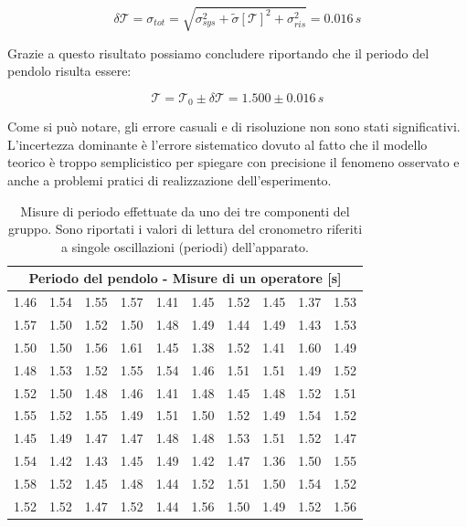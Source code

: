 \begin{equation*}
	\delta\mathcal{T} = \sigma_{tot} = \sqrt{\sigma_{sys}^2 + \tilde{\sigma}[\mathcal{T}]^2 + \sigma_{ris}^2} = 0.016\,s
\end{equation*}

Grazie a questo risultato possiamo concludere riportando che il periodo del pendolo risulta essere:

\begin{equation}
	\mathcal{T} = \mathcal{T}_0 \pm \delta\mathcal{T} = 1.500 \pm 0.016\,s
\end{equation}

Come si può notare, gli errore casuali e di risoluzione non sono stati significativi.
L'incertezza dominante è l'errore sistematico dovuto al fatto che il modello teorico
è troppo semplicistico per spiegare con precisione il fenomeno osservato e anche
a problemi pratici di realizzazione dell'esperimento.

\begin{table}
	\centering
	\begin{tabular} {c c c c c | c c c c c}
		\toprule
		\multicolumn{10}{c}{Periodo del pendolo - Misure di un operatore [s]} \\
		\midrule
		1.46 & 1.54 & 1.55 & 1.57 & 1.41 & 1.45 & 1.52 & 1.45 & 1.37 & 1.53 \\
		1.57 & 1.50 & 1.52 & 1.50 & 1.48 & 1.49 & 1.44 & 1.49 & 1.43 & 1.53 \\
		1.50 & 1.50 & 1.56 & 1.61 & 1.45 & 1.38 & 1.52 & 1.41 & 1.60 & 1.49 \\
		1.48 & 1.53 & 1.52 & 1.55 & 1.54 & 1.46 & 1.51 & 1.51 & 1.49 & 1.52 \\
		1.52 & 1.50 & 1.48 & 1.46 & 1.41 & 1.48 & 1.45 & 1.48 & 1.52 & 1.51 \\
		\midrule
		1.55 & 1.52 & 1.55 & 1.49 & 1.51 & 1.50 & 1.52 & 1.49 & 1.54 & 1.52 \\
		1.45 & 1.49 & 1.47 & 1.47 & 1.48 & 1.48 & 1.53 & 1.51 & 1.52 & 1.47 \\
		1.54 & 1.42 & 1.43 & 1.45 & 1.49 & 1.42 & 1.47 & 1.36 & 1.50 & 1.55 \\
		1.58 & 1.52 & 1.45 & 1.48 & 1.44 & 1.52 & 1.51 & 1.50 & 1.54 & 1.52 \\
		1.52 & 1.52 & 1.47 & 1.52 & 1.44 & 1.56 & 1.50 & 1.49 & 1.52 & 1.56 \\
	\bottomrule
	\end{tabular}
	\caption{Misure di periodo effettuate da uno dei tre componenti del gruppo.
        Sono riportati i valori di lettura del cronometro riferiti a singole oscillazioni
        (periodi) dell'apparato.}
    \label{tab:pendolo100}
\end{table}

